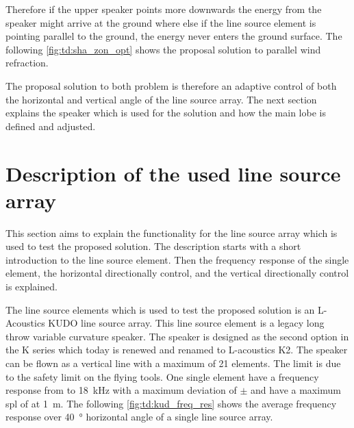 Therefore if the upper speaker points more downwards the energy from the speaker might arrive at the ground where else if the line source element is pointing parallel to the ground, the energy never enters the ground surface. The following \autoref{fig:td:sha_zon_opt} shows the proposal solution to parallel wind refraction.  


The proposal solution to both problem is therefore an adaptive control of both the horizontal and vertical angle of the line source array. The next section explains the speaker which is used for the solution and how the main lobe is defined and adjusted.


\section{Description of the used line source array}\label{sec:prop:des_of_lin}

This section aims to explain the functionality for the line source array which is used to test the proposed solution. The description starts with a short introduction to the line source element. Then the frequency response of the single element, the horizontal directionally control, and the vertical directionally control is explained.

The line source elements which is used to test the proposed solution is an L-Acoustics KUDO line source array. This line source element is a legacy long throw variable curvature speaker. The speaker is designed as the second option in the K series which today is renewed and renamed to L-acoustics K2. The speaker can be flown as a vertical line with a maximum of 21 elements. The limit is due to the safety limit on the flying tools. One single element have a frequency response from  to \SI{18}{\kilo\hertz} with a maximum deviation of $\pm$  and have a maximum \gls{spl} of  at \SI{1}{\meter}. The following \autoref{fig:td:kud_freq_res} shows the average frequency response over \SI{40}{\degree} horizontal angle of a single line source array.



